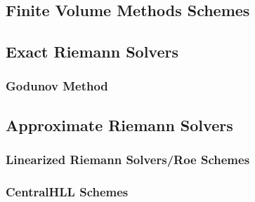 \documentclass[
  fourColumns,
  landscape
]{formularyETH/formularyETH}
\begin{document}
\subsection*{Finite Volume Methods Schemes}
  \subsection{Exact Riemann Solvers}\label{subsec:exact_riemann_solvers}
    \subsubsection{Godunov Method}\label{subsec:godunov_method}
      
      
  \subsection{Approximate Riemann Solvers}\label{subsec:approximate_riemann_solvers}
    \subsubsection{Linearized Riemann Solvers/Roe Schemes}
      
      \label{subsubsubsec:arithmetic_average}
        
      \label{subsubsec:roes_scheme}
        
    \subsubsection{Central\aslash HLL Schemes}\label{subsubsec:central_schemes}
      
      \label{subsubsubsec:lax-friedrichs_scheme}
        
      \label{subsubsubsec:rusanov_scheme}
        
      \label{subsubsubsec:enquist-osher_flux}
        
\newpage
{}
\end{document}
